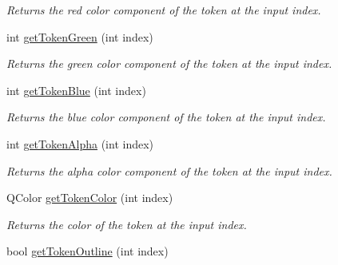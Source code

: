 \begin{DoxyCompactItemize}
\begin{DoxyCompactList}\small\item\em Returns the red color component of the token at the input index. \end{DoxyCompactList}\item 
\hypertarget{class_picto_1_1_token_tray_graphic_a407811456cbb53118f0ab0132c6b4680}{int \hyperlink{class_picto_1_1_token_tray_graphic_a407811456cbb53118f0ab0132c6b4680}{get\-Token\-Green} (int index)}\label{class_picto_1_1_token_tray_graphic_a407811456cbb53118f0ab0132c6b4680}

\begin{DoxyCompactList}\small\item\em Returns the green color component of the token at the input index. \end{DoxyCompactList}\item 
\hypertarget{class_picto_1_1_token_tray_graphic_ab7735e4ca7fe59c0cd7ef1afef2ac5eb}{int \hyperlink{class_picto_1_1_token_tray_graphic_ab7735e4ca7fe59c0cd7ef1afef2ac5eb}{get\-Token\-Blue} (int index)}\label{class_picto_1_1_token_tray_graphic_ab7735e4ca7fe59c0cd7ef1afef2ac5eb}

\begin{DoxyCompactList}\small\item\em Returns the blue color component of the token at the input index. \end{DoxyCompactList}\item 
\hypertarget{class_picto_1_1_token_tray_graphic_a2c365f7d2e3afab7317c51ef25fc156f}{int \hyperlink{class_picto_1_1_token_tray_graphic_a2c365f7d2e3afab7317c51ef25fc156f}{get\-Token\-Alpha} (int index)}\label{class_picto_1_1_token_tray_graphic_a2c365f7d2e3afab7317c51ef25fc156f}

\begin{DoxyCompactList}\small\item\em Returns the alpha color component of the token at the input index. \end{DoxyCompactList}\item 
\hypertarget{class_picto_1_1_token_tray_graphic_aadd1e12c64faee0fe9f263fa94de1da7}{Q\-Color \hyperlink{class_picto_1_1_token_tray_graphic_aadd1e12c64faee0fe9f263fa94de1da7}{get\-Token\-Color} (int index)}\label{class_picto_1_1_token_tray_graphic_aadd1e12c64faee0fe9f263fa94de1da7}

\begin{DoxyCompactList}\small\item\em Returns the color of the token at the input index. \end{DoxyCompactList}\item 
\hypertarget{class_picto_1_1_token_tray_graphic_ae3a58dcee30200b0768eb1a2db644153}{bool \hyperlink{class_picto_1_1_token_tray_graphic_ae3a58dcee30200b0768eb1a2db644153}{get\-Token\-Outline} (int index)}\label{class_picto_1_1_token_tray_graphic_ae3a58dcee30200b0768eb1a2db644153}


\end{DoxyCompactItemize}

